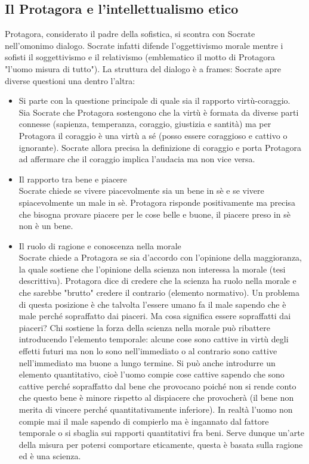 \documentclass[10pt,a4paper]{article}
\begin{document}
\subsection{Il Protagora e l'intellettualismo etico}
Protagora, considerato il padre della sofistica, si scontra con Socrate nell'omonimo dialogo. Socrate infatti difende l'oggettivismo morale mentre i sofisti il soggettivismo e il relativismo (emblematico il motto di Protagora "l'uomo misura di tutto"). La struttura del dialogo è a frames: Socrate apre diverse questioni una dentro l'altra:
\begin{itemize}
	\item Si parte con la questione principale di quale sia il rapporto virtù-coraggio.\\
	Sia Socrate che Protagora sostengono che la virtù è formata da diverse parti connesse (sapienza, temperanza, coraggio, giustizia e santità) ma per Protagora il coraggio è una virtù a sé (posso essere coraggioso e cattivo o ignorante). Socrate allora precisa la definizione di coraggio e porta Protagora ad affermare che il coraggio implica l'audacia ma non vice versa.
	\item Il rapporto tra bene e piacere\\
	Socrate chiede se vivere piacevolmente sia un bene in sè e se vivere spiacevolmente un male in sè. Protagora risponde positivamente ma precisa che bisogna provare piacere per le cose belle e buone, il piacere preso in sè non è un bene.
	\item Il ruolo di ragione e conoscenza nella morale\\
	Socrate chiede a Protagora se sia d'accordo con l'opinione della maggioranza, la quale sostiene che l'opinione della scienza non interessa la morale (tesi descrittiva). Protagora dice di credere che la scienza ha ruolo nella morale e che sarebbe "brutto" credere il contrario (elemento normativo). Un problema di questa posizione è che talvolta l'essere umano fa il male sapendo che è male perché sopraffatto dai piaceri. Ma cosa significa essere sopraffatti dai piaceri? Chi sostiene la forza della scienza nella morale può ribattere introducendo l'elemento temporale: alcune cose sono cattive in virtù degli effetti futuri ma non lo sono nell'immediato o al contrario sono cattive nell'immediato ma buone a lungo termine. Si può anche introdurre un elemento quantitativo, cioè l'uomo compie cose cattive sapendo che sono cattive perché sopraffatto dal bene che provocano poiché non si rende conto che questo bene è minore rispetto al dispiacere che provocherà (il bene non merita di vincere perché quantitativamente inferiore). In realtà l'uomo non compie mai il male sapendo di compierlo ma è ingannato dal fattore temporale o si sbaglia sui rapporti quantitativi fra beni. Serve dunque un'arte della misura per potersi comportare eticamente, questa è basata sulla ragione ed è una scienza. 

\end{itemize}
\end{document}
